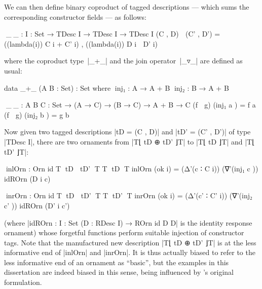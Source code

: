 We can then define binary coproduct of tagged descriptions --- which sums the corresponding constructor fields --- as follows:
\begin{code}
^^^_⊕_ : {I : Set} → TDesc I → TDesc I → TDesc I
(C , D) ⊕ (C' , D') = ((lambda(i)) C i + C' i) , ((lambda(i)) D i ▿ D' i)
\end{code}
where the coproduct type~|_+_| and the join operator~|_▿_| are defined as usual:
\begin{code}
data _+_ (A B : Set) : Set where
  ^^^inj₁  : A  → A + B
  ^^^inj₂  : B  → A + B

^^^_▿_ : {A B C : Set} → (A → C) → (B → C) → A + B → C
(f ▿ g) (inj₁  a  ) = f a
(f ▿ g) (inj₂  b  ) = g b
\end{code}
Now given two tagged descriptions |tD = (C , D)| and |tD' = (C' , D')| of type |TDesc I|, there are two ornaments from |T⌊ tD ⊕ tD' ⌋T| to |T⌊ tD ⌋T| and |T⌊ tD' ⌋T|:
\begin{code}
^^^inlOrn  : Orn id T⌊ tD ⊕ tD' ⌋T T⌊ tD ⌋T
inlOrn   (ok i) = (Δ'(c   ∶ C i))   (∇'(inj₁  c   ))  idROrn (D i c)

^^^inrOrn  : Orn id T⌊ tD ⊕ tD' ⌋T T⌊ tD' ⌋T
inrOrn   (ok i) = (Δ'(c'  ∶ C' i))  (∇'(inj₂  c'  ))  idROrn (D' i c')
\end{code}
(where |idROrn : {I : Set} (D : RDesc I) → ROrn id D D| is the identity response ornament) whose forgetful functions perform suitable injection of constructor tags.
Note that the manufactured new description |T⌊ tD ⊕ tD' ⌋T| is at the less informative end of |inlOrn| and |inrOrn|.
It is thus actually biased to refer to the less informative end of an ornament as ``basic'', but the examples in this dissertation are indeed biased in this sense, being influenced by \citeauthor{McBride-ornaments}'s original formulation.

